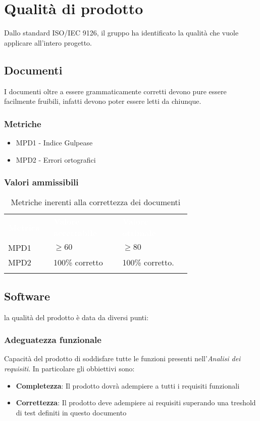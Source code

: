 \section{Qualità di prodotto}
Dallo standard ISO/IEC 9126, il gruppo ha identificato la qualità che vuole applicare all'intero progetto.
\subsection{Documenti}
I documenti oltre a essere grammaticamente corretti devono pure essere facilmente fruibili, infatti devono 
poter essere letti da chiunque.
\subsubsection{Metriche}
\begin{itemize}
    \item MPD1 - Indice Gulpease
    \item MPD2 - Errori ortografici
\end{itemize}
\subsubsection{Valori ammissibili}
{\renewcommand{\arraystretch}{1.5}
\begin{longtable}{p{0.12\linewidth}p{0.30\linewidth}p{0.30\linewidth}}
	\rowcolor[RGB]{33, 73, 50}
	\textcolor{white}{\textbf{Metrica}} & \textcolor{white}{\textbf{Valore accettabile}} & \textcolor{white}{\textbf{Valore ottimale}}\\
    \rowcolor[RGB]{216, 235, 171}
    MPD1 & $ \geq 60$ & $ \geq 80$\\
    \rowcolor[RGB]{233, 245, 206}
    MPD2 & 100\% corretto & 100\% corretto.\\ 
    \caption{Metriche inerenti alla correttezza dei documenti}
\end{longtable}	
}
\subsection{Software}
la qualità del prodotto è data da diversi punti:
\subsubsection{Adeguatezza funzionale}
Capacità del prodotto di soddisfare tutte le funzioni presenti nell'\textit{Analisi dei requisiti}. 
In particolare gli obbiettivi sono:
\begin{itemize}
    \item \textbf{Completezza}: Il prodotto dovrà adempiere a tutti i requisiti funzionali
    \item \textbf{Correttezza}: Il prodotto deve adempiere ai requisiti superando una treshold di test definiti in questo documento
\end{itemize}    

